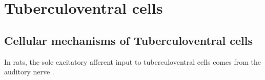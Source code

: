 \section{Tuberculoventral cells}


\subsection{Cellular mechanisms of Tuberculoventral cells}

In rats, the sole excitatory afferent input to tuberculoventral cells comes from the auditory nerve \citep{RubioJuiz:2004}.


\citep{RubioJuiz:2004}




